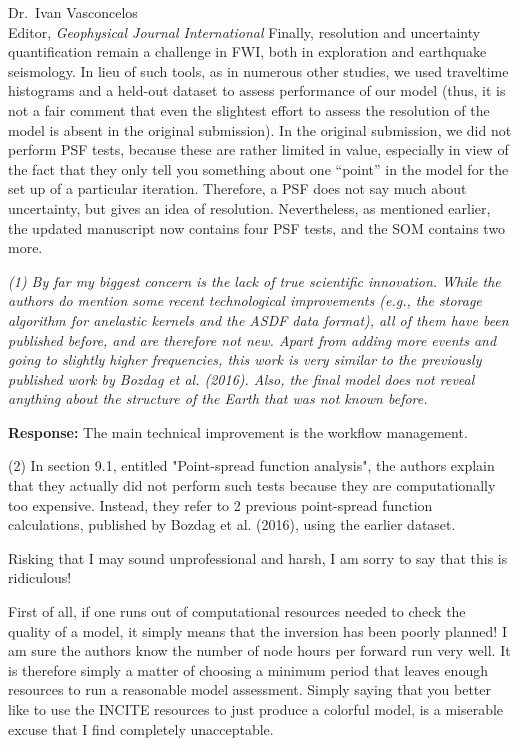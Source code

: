 \documentclass[11pt,a4paper]{letter}
\newcommand{\response}[1]{\textbf{Response:} #1}
\newcommand{\rev}[1]{{\it{#1}}}
\begin{document}
\begin{letter}{Dr.~Ivan Vasconcelos\\
Editor, \textit{Geophysical Journal International}}
{Finally, resolution and uncertainty quantification remain a challenge in FWI,
both in exploration and earthquake seismology.
In lieu of such tools,
as in numerous other studies,
we used traveltime histograms and a held-out dataset to assess performance of our model (thus, it is not a fair comment that even the slightest effort to assess the resolution of the model is absent in the original submission).
In the original submission, we did not perform PSF tests, because these are rather limited in value, especially in view of the fact that they only tell you something about one ``point'' in the model for the set up of a particular iteration.
Therefore, a PSF does not say much about uncertainty, but gives an idea of resolution.
Nevertheless,
as mentioned earlier,
the updated manuscript now contains four PSF tests,
and the SOM contains two more.}


\rev{(1) By far my biggest concern is the lack of true scientific innovation. While the authors do mention some recent technological improvements (e.g., the storage algorithm for anelastic kernels and the ASDF data format), all of them have been published before, and are therefore not new. Apart from adding more events and going to slightly higher frequencies, this work is very similar to the previously published work by Bozdag et al. (2016). Also, the final model does not reveal anything about the structure of the Earth that was not known before.
}

\response{The main technical improvement is the workflow management.}


\rev{(2) In section 9.1, entitled "Point-spread function analysis", the authors explain that they actually did not perform such tests because they are computationally too expensive. Instead, they refer to 2 previous point-spread function calculations, published by Bozdag et al. (2016), using the earlier dataset. 

Risking that I may sound unprofessional and harsh, I am sorry to say that this is ridiculous!

First of all, if one runs out of computational resources needed to check the quality of a model, it simply means that the inversion has been poorly planned! I am sure the authors know the number of node hours per forward run very well. It is therefore simply a matter of choosing a minimum period that leaves enough resources to run a reasonable model assessment. Simply saying that you better like to use the INCITE resources to just produce a colorful model, is a miserable excuse that I find completely unacceptable.

}
\end{letter}
\end{document}
